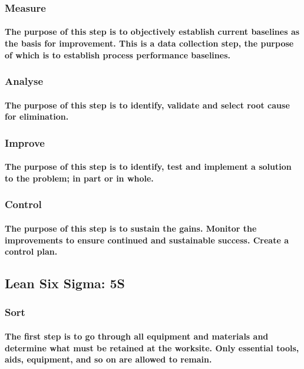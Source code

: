 \documentclass{acm_proc_article-sp}
\begin{document}
\subsubsection{Measure}
\paragraph{The purpose of this step is to objectively establish current baselines as the basis for improvement. This is a data collection step, the purpose of which is to establish process performance baselines.}
\subsubsection{Analyse}
\paragraph{The purpose of this step is to identify, validate and select root cause for elimination.}
\subsubsection{Improve}
\paragraph{The purpose of this step is to identify, test and implement a solution to the problem; in part or in whole.}
\subsubsection{Control}
\paragraph{The purpose of this step is to sustain the gains. Monitor the improvements to ensure continued and sustainable success. Create a control plan.}
\subsection{Lean Six Sigma: 5S}
\subsubsection{Sort}
\paragraph{The first step is to go through all equipment and materials and determine what must be retained at the worksite. Only essential tools, aids, equipment, and so on are allowed to remain.}
\end{document}
